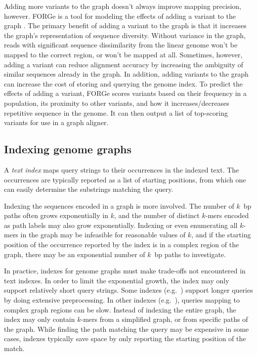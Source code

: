 Adding more variants to the graph doesn't always improve mapping precision, however.
FORGe is a tool for modeling the effects of adding a variant to the graph \cite{Pritt_2018}. 
The primary benefit of adding a variant to the graph is that it increases the graph's representation of sequence diversity.
Without variance in the graph, reads with significant sequence dissimilarity from the linear genome won't be mapped to the correct region, or won't be mapped at all.
Sometimes, however, adding a variant can reduce alignment accuracy by increasing the ambiguity of similar sequences already in the graph.
In addition, adding variants to the graph can increase the cost of storing and querying the genome index.
To predict the effects of adding a variant, FORGe scores variants based on their frequency in a population, its proximity to other variants, and how it increases/decreases repetitive sequence in the genome.
It can then output a list of top-scoring variants for use in a graph aligner.


\subsection{Indexing genome graphs}

A \emph{text index} maps query strings to their occurrences in the indexed text.
The occurrences are typically reported as a list of starting positions, from which one can easily determine the substrings matching the query.

Indexing the sequences encoded in a graph is more involved.
The number of $k$~bp paths often grows exponentially in $k$, and the number of distinct $k$-mers encoded as path labels may also grow exponentially.
Indexing or even enumerating all $k$-mers in the graph may be infeasible for reasonable values of $k$, and if the starting position of the occurrence reported by the index is in a complex region of the graph, there may be an exponential number of $k$~bp paths to investigate.

In practice, indexes for genome graphs must make trade-offs not encountered in text indexes.
In order to limit the exponential growth, the index may only support relatively short query strings.
Some indexes (e.g.\ \cite{Siren_2014}) support longer queries by doing extensive preprocessing.
In other indexes (e.g.\ \cite{Huang_2013,Maciuca_2016}), queries mapping to complex graph regions can be slow.
Instead of indexing the entire graph, the index may only contain $k$-mers from a simplified graph, or from specific paths of the graph.
While finding the path matching the query may be expensive in some cases, indexes typically save space by only reporting the starting position of the match.

